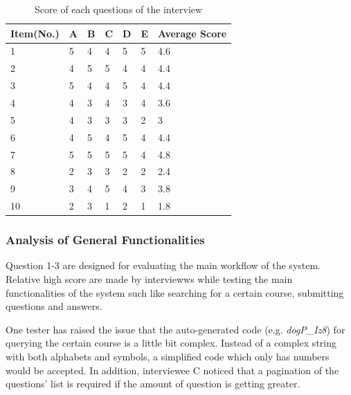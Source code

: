 \begin{table}[!htbp]
\centering
\begin{tabularx}{\textwidth}{@{}lXXXXXl@{}}
\toprule
Item(No.)       & A  & B  & C  & D  & E          & Average Score        \\ \midrule
1               & 5  & 4  & 4  & 5  & 5          & 4.6                     \\
2               & 4  & 5  & 5  & 4  & 4          & 4.4                     \\
3               & 5  & 4  & 4  & 5  & 4          & 4.4                     \\
4               & 4  & 3  & 4  & 3  & 4          & 3.6                    \\
5               & 4  & 3  & 3  & 3  & 2          & 3                     \\
6               & 4  & 5  & 4  & 5  & 4          & 4.4                     \\
7               & 5  & 5  & 5  & 5  & 4          & 4.8                     \\
8               & 2  & 3  & 3  & 2  & 2          & 2.4                     \\
9               & 3  & 4  & 5  & 4  & 3          & 3.8                     \\
10               & 2  & 3  & 1  & 2  & 1          & 1.8                     \\ \bottomrule    
\end{tabularx}
\caption{Score of each questions of the interview}
\label{table:score-interview}
\end{table}

\subsubsection{Analysis of General Functionalities}
Question 1-3 are designed for evaluating the main workflow of the system. Relative high score are made by interviewws while testing the main functionalities of the system such like searching for a certain course, submitting questions and answers.

One tester has raised the issue that the auto-generated code (e.g. \textit{dogP\_Iz8}) for querying the certain course is a little bit complex. Instead of a complex string with both alphabets and symbols, a simplified code which only has numbers would be accepted. In addition, interviewee C noticed that a pagination of the questions' list is required if the amount of question is getting greater.

